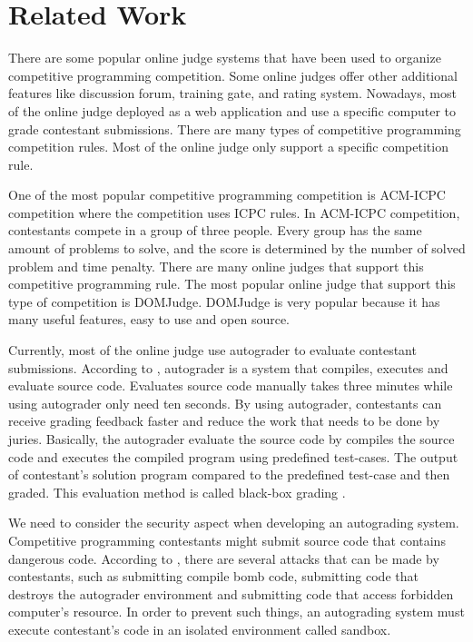 \documentclass[conference]{IEEEtran}
\begin{document}
\section{Related Work}

There are some popular online judge systems that have been used to organize competitive programming competition. Some online judges offer other additional features like discussion forum, training gate, and rating system. Nowadays, most of the online judge deployed as a web application and use a specific computer to grade contestant submissions. There are many types of competitive programming competition rules. Most of the online judge only support a specific competition rule.

One of the most popular competitive programming competition is ACM-ICPC competition where the competition uses ICPC rules. In ACM-ICPC competition, contestants compete in a group of three people. Every group has the same amount of problems to solve, and the score is determined by the number of solved problem and time penalty. There are many online judges that support this competitive programming rule. The most popular online judge that support this type of competition is DOMJudge. DOMJudge is very popular because it has many useful features, easy to use and open source.

Currently, most of the online judge use autograder to evaluate contestant submissions. According to \cite{danutamalms}, autograder is a system that compiles, executes and evaluate source code. Evaluates source code manually takes three minutes while using autograder only need ten seconds. By using autograder, contestants can receive grading feedback faster and reduce the work that needs to be done by juries. Basically, the autograder evaluate the source code by compiles the source code and executes the compiled program using predefined test-cases. The output of contestant's solution program compared to the predefined test-case and then graded. This evaluation method is called black-box grading \cite{jordanioi}.

We need to consider the security aspect when developing an autograding system. Competitive programming contestants might submit source code that contains dangerous code. According to \cite{wasikojsurvey}, there are several attacks that can be made by contestants, such as submitting compile bomb code, submitting code that destroys the autograder environment and submitting code that access forbidden computer's resource. In order to prevent such things, an autograding system must execute contestant's code in an isolated environment called sandbox.
\end{document}
